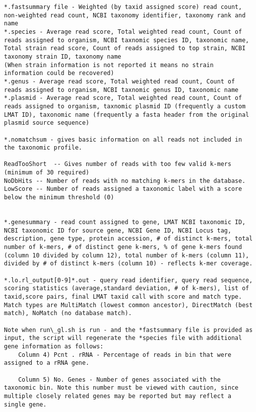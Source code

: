 \documentclass[11pt]{article}
\begin{document}
\begin{verbatim}
*.fastsummary file - Weighted (by taxid assigned score) read count, non-weighted read count, NCBI taxonomy identifier, taxonomy rank and name
*.species - Average read score, Total weighted read count, Count of reads assigned to organism, NCBI taxnomic species ID, taxonomic name, Total strain read score, Count of reads assigned to top strain, NCBI taxonomy strain ID, taxonomy name
(When strain information is not reported it means no strain information could be recovered)
*.genus - Average read score, Total weighted read count, Count of reads assigned to organism, NCBI taxnomic genus ID, taxonomic name
*.plasmid - Average read score, Total weighted read count, Count of reads assigned to organism, taxnomic plasmid ID (frequently a custom LMAT ID), taxonomic name (frequently a fasta header from the original plasmid source sequence)

*.nomatchsum - gives basic information on all reads not included in the taxonomic profile.

ReadTooShort  -- Gives number of reads with too few valid k-mers (minimum of 30 required)
NoDbHits -- Number of reads with no matching k-mers in the database.
LowScore -- Number of reads assigned a taxonomic label with a score below the minimum threshold (0)


*.genesummary - read count assigned to gene, LMAT NCBI taxonomic ID, NCBI taxonomic ID for source gene, NCBI Gene ID, NCBI Locus tag, description, gene type, protein accession, # of distinct k-mers, total number of k-mers, # of distinct gene k-mers, % of gene k-mers found (column 10 divided by column 12), total number of k-mers (column 11), divided by # of distinct k-mers (column 10) - reflects k-mer coverage.

*.lo.rl_output[0-9]*.out - query read identifier, query read sequence, scoring statistics (average,standard deviation, # of k-mers), list of taxid,score pairs, final LMAT taxid call with score and match type. Match types are MultiMatch (lowest common ancestor), DirectMatch (best match), NoMatch (no database match).

Note when run\_gl.sh is run - and the *fastsummary file is provided as input, the script will regenerate the *species file with additional gene information as follows:
    Column 4) Pcnt . rRNA - Percentage of reads in bin that were assigned to a rRNA gene.

    Column 5) No. Genes - Number of genes associated with the taxonomic bin. Note this number must be viewed with caution, since multiple closely related genes may be reported but may reflect a single gene.


\end{verbatim}
\end{document}
